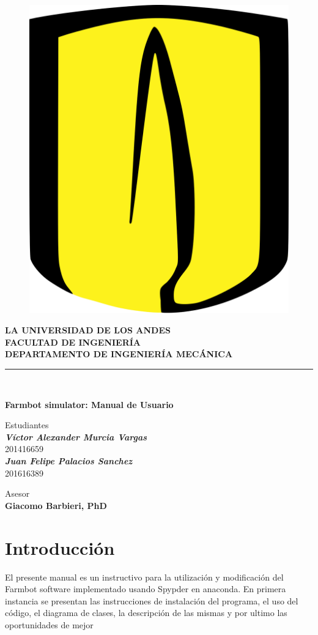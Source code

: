\documentclass[letterpaper,12pt]{article}
\begin{document}
	\begin{titlepage}
		\begin{center}
			\begin{figure}
				\centering
				\includegraphics[width=0.1\linewidth]{1200px-University_of_Los_Andes_logo.png}
				\label{fig:1200px-universityoflosandeslogo}
			\end{figure}
			\textbf{LA UNIVERSIDAD DE LOS ANDES}\\
			\textbf{FACULTAD DE INGENIERÍA}\\
			\textbf{DEPARTAMENTO DE INGENIERÍA MECÁNICA}\\
			\rule{80mm}{0.1mm}\\
			\vspace*{40mm}
			
			
			\vspace*{10mm}
			
			\begin{large}
				\textbf{Farmbot simulator: Manual de Usuario}\\
			\end{large}
			
			
			\vspace*{30mm}
			Estudiantes\\
			\textbf{\textit{Víctor Alexander Murcia Vargas}}\\
			201416659\\
			
			\textbf{\textit{Juan Felipe Palacios Sanchez}}\\
			201616389\\
			
			\vspace*{30mm}
			
			Asesor\\
			\textbf{Giacomo Barbieri, PhD}		
		\end{center}
	\end{titlepage}

	\tableofcontents
	\newpage
	
	\section{Introducción}
	El presente manual es un instructivo para la utilización y modificación del Farmbot software implementado usando Spypder en anaconda. En primera instancia se presentan las instrucciones de instalación del programa, el uso del código, el diagrama de clases, la descripción de las mismas y por ultimo las oportunidades de mejor
\end{document}

